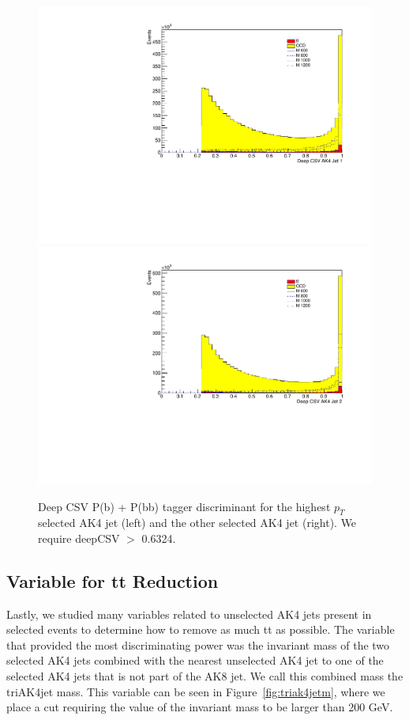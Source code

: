 \begin{figure}[h]
\begin{center}
\includegraphics[scale=0.34]{F5/shapebtag1.pdf}
\includegraphics[scale=0.34]{F5/shapebtag2.pdf}
\end{center}
\caption{Deep CSV P(b) + P(bb) tagger discriminant for the highest $p_{T}$ selected AK4 jet (left) and the other selected AK4 jet (right). We require deepCSV $>$ 0.6324.}
\label{fig:AK4btag}
\end{figure} 

\subsection{Variable for tt Reduction}

Lastly, we studied many variables related to unselected AK4 jets present in selected events to determine how to remove as much tt as possible. The variable that provided the most discriminating power was the invariant mass of the two selected AK4 jets combined with the nearest unselected AK4 jet to one of the selected AK4 jets that is not part of the AK8 jet. We call this combined mass the triAK4jet mass. This variable can be seen in Figure~\ref{fig:triak4jetm}, where we place a cut requiring the value of the invariant mass to be larger than 200 GeV. 

